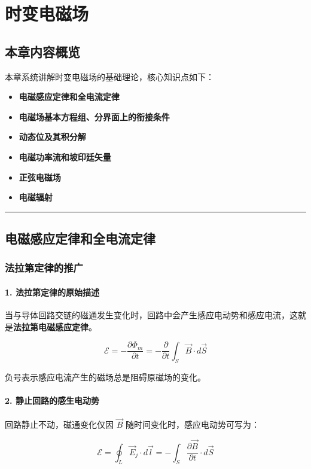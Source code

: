 
\section{时变电磁场}

\subsection{本章内容概览}
本章系统讲解时变电磁场的基础理论，核心知识点如下：
\begin{itemize}
    \item \textbf{电磁感应定律和全电流定律}
    \item \textbf{电磁场基本方程组、分界面上的衔接条件}
    \item \textbf{动态位及其积分解}
    \item \textbf{电磁功率流和坡印廷矢量}
    \item \textbf{正弦电磁场}
    \item \textbf{电磁辐射}
\end{itemize}

\vspace{0.8cm}\hrule\vspace{0.8cm}

\subsection{电磁感应定律和全电流定律}
\subsubsection{法拉第定律的推广}
\paragraph{1. 法拉第定律的原始描述}
当与导体回路交链的磁通发生变化时，回路中会产生感应电动势和感应电流，这就是\textbf{法拉第电磁感应定律}。

\begin{formulaBox}
\[
\mathcal{E} = -\frac{\partial \Phi_m}{\partial t} = -\frac{\partial}{\partial t} \int_{S} \vec{B} \cdot d\vec{S}
\]
\end{formulaBox}

负号表示感应电流产生的磁场总是阻碍原磁场的变化。

\paragraph{2. 静止回路的感生电动势}
回路静止不动，磁通变化仅因 $\vec{B}$ 随时间变化时，感应电动势可写为：
\begin{formulaBox}
\[
\mathcal{E} = \oint_{L} \vec{E}_j \cdot d\vec{l} = -\int_{S} \frac{\partial \vec{B}}{\partial t} \cdot d\vec{S}
\]
\end{formulaBox}

